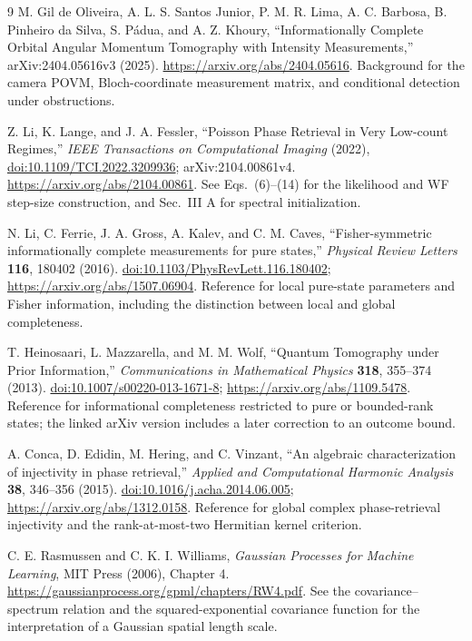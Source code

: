 \documentclass[11pt,a4paper]{article}
\begin{document}
\begin{thebibliography}{9}
M. Gil de Oliveira, A. L. S. Santos Junior, P. M. R. Lima,
A. C. Barbosa, B. Pinheiro da Silva, S. P\'adua, and A. Z. Khoury,
``Informationally Complete Orbital Angular Momentum Tomography with
Intensity Measurements,'' arXiv:2404.05616v3 (2025).
\url{https://arxiv.org/abs/2404.05616}.
Background for the camera POVM, Bloch-coordinate measurement matrix,
and conditional detection under obstructions.

Z. Li, K. Lange, and J. A. Fessler,
``Poisson Phase Retrieval in Very Low-count Regimes,''
\emph{IEEE Transactions on Computational Imaging} (2022),
\href{https://doi.org/10.1109/TCI.2022.3209936}{doi:10.1109/TCI.2022.3209936};
arXiv:2104.00861v4.
\url{https://arxiv.org/abs/2104.00861}.
See Eqs.~(6)--(14) for the likelihood and WF step-size construction,
and Sec.~III A for spectral initialization.

N. Li, C. Ferrie, J. A. Gross, A. Kalev, and C. M. Caves,
``Fisher-symmetric informationally complete measurements for pure states,''
\emph{Physical Review Letters} \textbf{116}, 180402 (2016).
\href{https://doi.org/10.1103/PhysRevLett.116.180402}{doi:10.1103/PhysRevLett.116.180402};
\url{https://arxiv.org/abs/1507.06904}.
Reference for local pure-state parameters and Fisher information,
including the distinction between local and global completeness.

T. Heinosaari, L. Mazzarella, and M. M. Wolf,
``Quantum Tomography under Prior Information,''
\emph{Communications in Mathematical Physics} \textbf{318}, 355--374 (2013).
\href{https://doi.org/10.1007/s00220-013-1671-8}{doi:10.1007/s00220-013-1671-8};
\url{https://arxiv.org/abs/1109.5478}.
Reference for informational completeness restricted to pure or bounded-rank
states; the linked arXiv version includes a later correction to an outcome bound.

A. Conca, D. Edidin, M. Hering, and C. Vinzant,
``An algebraic characterization of injectivity in phase retrieval,''
\emph{Applied and Computational Harmonic Analysis} \textbf{38}, 346--356 (2015).
\href{https://doi.org/10.1016/j.acha.2014.06.005}{doi:10.1016/j.acha.2014.06.005};
\url{https://arxiv.org/abs/1312.0158}.
Reference for global complex phase-retrieval injectivity and the
rank-at-most-two Hermitian kernel criterion.

C. E. Rasmussen and C. K. I. Williams,
\emph{Gaussian Processes for Machine Learning}, MIT Press (2006), Chapter 4.
\url{https://gaussianprocess.org/gpml/chapters/RW4.pdf}.
See the covariance--spectrum relation and the squared-exponential covariance
function for the interpretation of a Gaussian spatial length scale.
\end{thebibliography}
\end{document}
